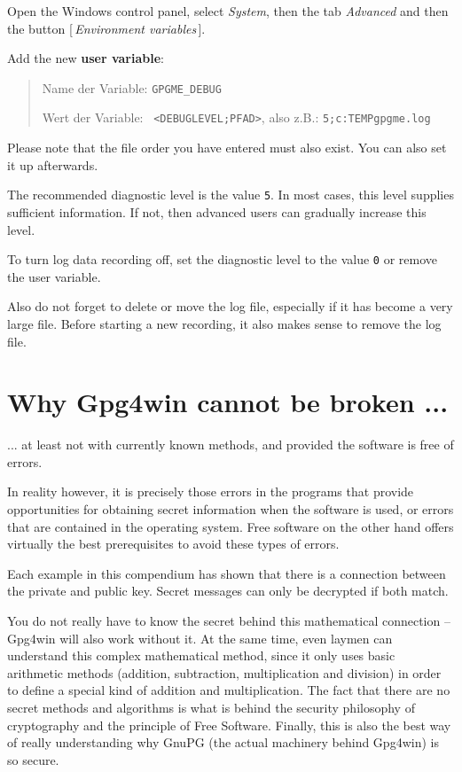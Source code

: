 \documentclass[a4paper,11pt,oneside,openright,titlepage]{scrbook}
\newcommand{\Button}[1]{[\,\textit{#1}\,]}
\newcommand{\Menu}[1]{\textit{#1}}
\newcommand{\Filename}[1]{\small{\texttt{#1}}\normalsize}
\begin{document}
Open the Windows control panel, select  \Menu{System}, then the tab
\Menu{Advanced} and then the button \Button{Environment variables}.

Add the new \textbf{user variable}:

\begin{quote}
    Name der Variable: \Filename{GPGME\_DEBUG}

    Wert der Variable: ~\Filename{<DEBUGLEVEL;PFAD>}, also z.B.:
     \Filename{5;c:\back{}TEMP\back{}gpgme.log}
\end{quote}

Please note that the file order you have entered must also exist. You
can also set it up afterwards.

The recommended diagnostic level is the value
\Filename{5}. In most cases, this level supplies sufficient
information. If not, then advanced users can gradually increase this
level.

To turn log data recording off, set the diagnostic level to the value
\Filename{0} or remove the user variable.

Also do not forget to delete or move the log file, especially if it
has become a very large file. Before starting a new recording, it also
makes sense to remove the log file.


\clearpage
\chapter{Why Gpg4win cannot be broken ...}
\label{ch:themath}

... at least not with currently known methods, and provided the
software is free of errors.

In reality however, it is precisely those errors in the programs that
provide opportunities for obtaining secret information when the
software is used, or errors that are contained in the operating
system. Free software on the other hand offers virtually the best
prerequisites to avoid these types of errors.

Each example in this compendium has shown that there is a connection
between the private and public key. Secret messages can only be
decrypted if both match.

You do not really have to know the secret behind this mathematical
connection -- Gpg4win will also work without it. At the same time,
even laymen can understand this complex mathematical method, since it
only uses basic arithmetic methods (addition, subtraction,
multiplication and division) in order to define a special kind of
addition and multiplication. The fact that there are no secret methods
and algorithms is what is behind the security
philosophy of cryptography and the
principle of Free Software. Finally, this is also the best way of
really understanding why GnuPG (the actual machinery behind Gpg4win)
is so secure.
\end{document}
